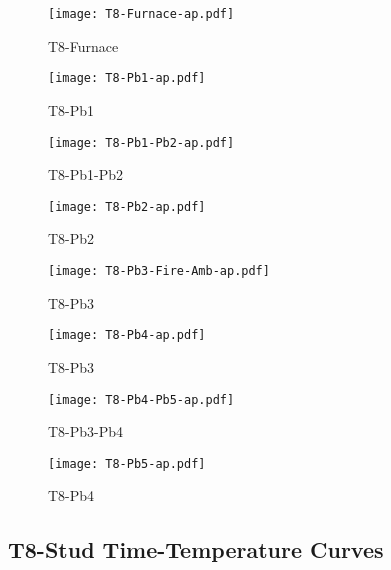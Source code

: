 \begin{figure}[htbp]
\centering
	\texttt{[image: T8-Furnace-ap.pdf]}
	\caption*{T8-Furnace}
\end{figure}
\begin{figure}[htbp]
	\centering
		\texttt{[image: T8-Pb1-ap.pdf]}
		\caption*{T8-Pb1}
\end{figure}
\begin{figure}[htbp]
	\centering
		\texttt{[image: T8-Pb1-Pb2-ap.pdf]}
		\caption*{T8-Pb1-Pb2}
\end{figure}
\begin{figure}[htbp]
	\centering
		\texttt{[image: T8-Pb2-ap.pdf]}
		\caption*{T8-Pb2}
\end{figure}
\begin{figure}[htbp]
	\centering
		\texttt{[image: T8-Pb3-Fire-Amb-ap.pdf]}
		\caption*{T8-Pb3}
\end{figure}
\begin{figure}[htbp]
	\centering
		\texttt{[image: T8-Pb4-ap.pdf]}
		\caption*{T8-Pb3}
\end{figure}
\begin{figure}[htbp]
	\centering
			\texttt{[image: T8-Pb4-Pb5-ap.pdf]}
			\caption*{T8-Pb3-Pb4}
\end{figure}
\begin{figure}[htbp]
	\centering
			\texttt{[image: T8-Pb5-ap.pdf]}
			\caption*{T8-Pb4}
\end{figure}

\pagebreak

\subsection*{T8-Stud Time-Temperature Curves}

